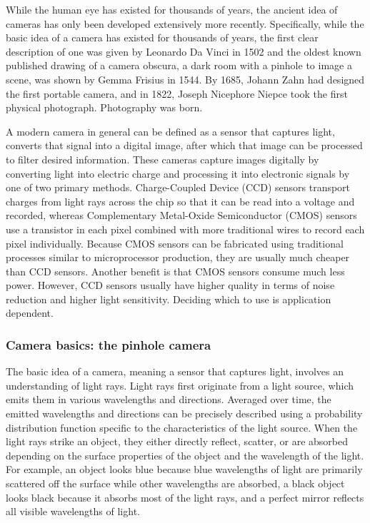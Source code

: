 While the human eye has existed for thousands of years, the ancient idea of cameras has only been developed extensively more recently. Specifically, while the basic idea of a camera has existed for thousands of years, the first clear description of one was given by Leonardo Da Vinci in 1502 and the oldest known published drawing of a camera obscura, a dark room with a pinhole to image a scene, was shown by Gemma Frisius in 1544. By 1685, Johann Zahn had designed the first portable camera, and in 1822, Joseph Nicephore Niepce took the first physical photograph. Photography was born.

A modern camera in general can be defined as a sensor that captures light, converts that signal into a digital image, after which that image can be processed to filter desired information. These cameras capture images digitally by converting light into electric charge and processing it into electronic signals by one of two primary methods. Charge-Coupled Device (CCD) sensors transport charges from light rays across the chip so that it can be read into a voltage and recorded, whereas Complementary Metal-Oxide Semiconductor (CMOS) sensors use a transistor in each pixel combined with more traditional wires to record each pixel individually. Because CMOS sensors can be fabricated using traditional processes similar to microprocessor production, they are usually much cheaper than CCD sensors. Another benefit is that CMOS sensors consume much less power. However, CCD sensors usually have higher quality in terms of noise reduction and higher light sensitivity. Deciding which to use is application dependent.

\subsubsection{Camera basics: the pinhole camera}

The basic idea of a camera, meaning a sensor that captures light, involves an understanding of light rays. Light rays first originate from a light source, which emits them in various wavelengths and directions. Averaged over time, the emitted wavelengths and directions can be precisely described using a probability distribution function specific to the characteristics of the light source. When the light rays strike an object, they either directly reflect, scatter, or are absorbed depending on the surface properties of the object and the wavelength of the light. For example, an object looks blue because blue wavelengths of light are primarily scattered off the surface while other wavelengths are absorbed, a black object looks black because it absorbs most of the light rays, and a perfect mirror reflects all visible wavelengths of light.

